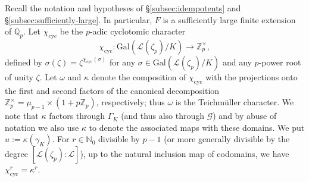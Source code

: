 \documentclass[12pt]{amsart}
\theoremstyle{plain}
\theoremstyle{remark}
\theoremstyle{definition}
\numberwithin{equation}{section}
\begin{document}
Recall the notation and hypotheses of \S \ref{subsec:idempotents} and \S \ref{subsec:sufficiently-large}.
In particular, $F$ is a sufficiently large finite extension of ${\mathbb{Q}}_{p}$.
Let $\chi_{\mathrm{cyc}}$ be the $p$-adic cyclotomic character
\[
\chi_{\mathrm{cyc}}: {\mathrm{Gal}}(\mathcal{L}(\zeta_{p})/K) \longrightarrow {\mathbb{Z}}_{p}^{\times},
\]
defined by $\sigma(\zeta) = \zeta^{\chi_{\mathrm{cyc}}(\sigma)}$ for any $\sigma \in {\mathrm{Gal}}(\mathcal{L}(\zeta_{p})/K)$ and any $p$-power root of unity $\zeta$.
Let $\omega$ and $\kappa$ denote the composition of $\chi_{\mathrm{cyc}}$ with the projections onto the first and second factors of the canonical decomposition ${\mathbb{Z}}_{p}^{\times} = \mu_{p-1} \times (1+p{\mathbb{Z}}_{p})$, respectively;
thus $\omega$ is the Teichm\"{u}ller character.
We note that $\kappa$ factors through $\Gamma_{K}$ 
(and thus also through $\mathcal{G}$) and by abuse of notation we also 
use $\kappa$ to denote the associated maps with these domains.
We put $u := \kappa(\gamma_{K})$.
For $r \in {\mathbb{N}}_{0}$ divisible by $p-1$ 
(or more generally divisible by the degree $[\mathcal{L}(\zeta_{p}) : \mathcal{L}]$), 
up to the natural inclusion map of codomains, 
we have $\chi_{\mathrm{cyc}}^{r}=\kappa^{r}$. 
\end{document}
